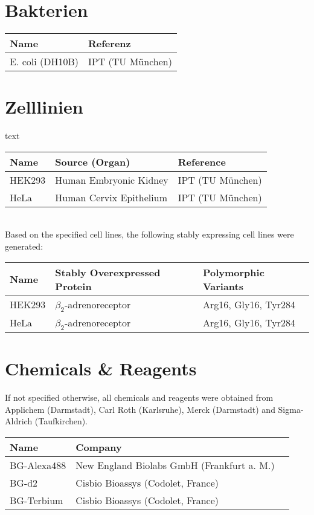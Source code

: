 \section{Bakterien}

\begin{tabular}{ll}
\toprule
Name		    &	Referenz\\
\midrule
E. coli (DH10B)	&    IPT (TU München)\\
\bottomrule
\end {tabular}


\section{Zelllinien}
text\\

\begin{tabular}{lll}
\toprule
Name		&	Source (Organ)				&	Reference\\
\midrule
HEK293		&	Human Embryonic Kidney		&	IPT (TU München)\\
HeLa		&	Human Cervix Epithelium		&	IPT (TU München)\\
\bottomrule
\end {tabular}\\

Based on the specified cell lines, the following stably expressing cell lines were generated:\\

\begin{tabular}{lll}
\toprule
Name		&	Stably Overexpressed Protein	&	Polymorphic Variants\\
\midrule
HEK293		&	$\beta_2$-adrenoreceptor		&	Arg16, Gly16, Tyr284\\
HeLa		&	$\beta_2$-adrenoreceptor		&	Arg16, Gly16, Tyr284\\
\bottomrule
\end{tabular}

\section{Chemicals \& Reagents}
If not specified otherwise, all chemicals and reagents were obtained from Applichem (Darmstadt), Carl Roth (Karlsruhe), Merck (Darmstadt) and Sigma-Aldrich (Taufkirchen). \\

\begin{tabular}{lll}
\toprule
Name							&	Company\\
\midrule
BG-Alexa488						&	New England Biolabs GmbH (Frankfurt a. M.)\\
BG-d2							&	Cisbio Bioassys (Codolet, France)\\
BG-Terbium						&	Cisbio Bioassys (Codolet, France)\\
\bottomrule
\end {tabular}

